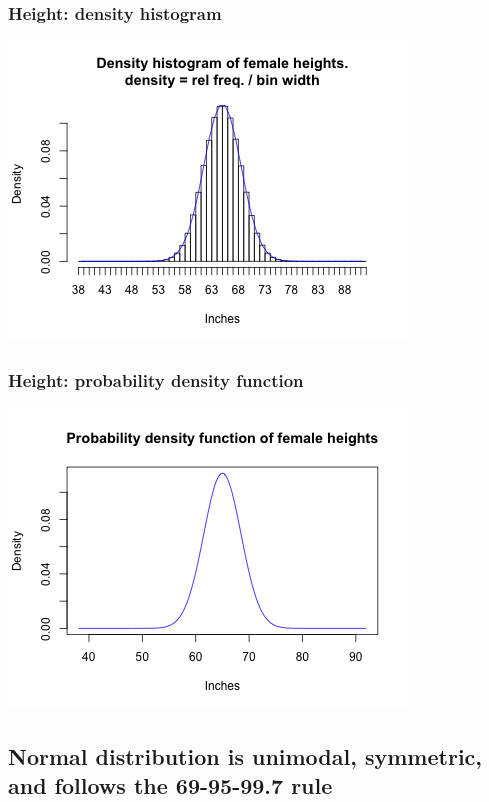 \documentclass[slidestop,compress,mathserif,12pt,t,professionalfonts,xcolor=table]{beamer}
\begin{document}
\begin{frame}
  \frametitle{Height: density histogram}

  \begin{center}
    \includegraphics[scale=0.7]{figures/density-histogram-1-line.png}
    \end{center}

\end{frame}

\begin{frame}
  \frametitle{Height: probability density function}

  \begin{center}
    \includegraphics[scale=0.7]{figures/pdf-line.png}
    \end{center}

\end{frame}




\subsection{Normal distribution is unimodal, symmetric, and follows the 69-95-99.7 rule}
\label{mi2}
\end{document}
